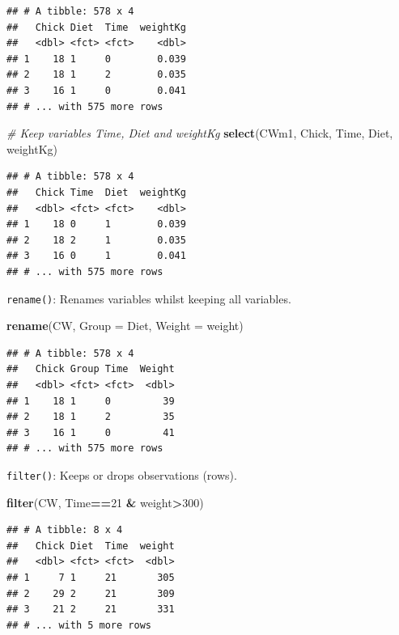 \documentclass[]{book}
\newenvironment{Shaded}{\begin{snugshade}}{\end{snugshade}}
\newcommand{\CommentTok}[1]{\textcolor[rgb]{0.56,0.35,0.01}{\textit{#1}}}
\newcommand{\DataTypeTok}[1]{\textcolor[rgb]{0.13,0.29,0.53}{#1}}
\newcommand{\DecValTok}[1]{\textcolor[rgb]{0.00,0.00,0.81}{#1}}
\newcommand{\KeywordTok}[1]{\textcolor[rgb]{0.13,0.29,0.53}{\textbf{#1}}}
\newcommand{\NormalTok}[1]{#1}
\newcommand{\OperatorTok}[1]{\textcolor[rgb]{0.81,0.36,0.00}{\textbf{#1}}}
\newcommand{\StringTok}[1]{\textcolor[rgb]{0.31,0.60,0.02}{#1}}
\theoremstyle{definition}
\theoremstyle{definition}
\theoremstyle{definition}
\theoremstyle{remark}
\begin{document}
\begin{verbatim}
## # A tibble: 578 x 4
##   Chick Diet  Time  weightKg
##   <dbl> <fct> <fct>    <dbl>
## 1    18 1     0        0.039
## 2    18 1     2        0.035
## 3    16 1     0        0.041
## # ... with 575 more rows
\end{verbatim}

\begin{Shaded}
\begin{Highlighting}[]
\CommentTok{# Keep variables Time, Diet and weightKg}
\KeywordTok{select}\NormalTok{(CWm1, Chick, Time, Diet, weightKg)}
\end{Highlighting}
\end{Shaded}

\begin{verbatim}
## # A tibble: 578 x 4
##   Chick Time  Diet  weightKg
##   <dbl> <fct> <fct>    <dbl>
## 1    18 0     1        0.039
## 2    18 2     1        0.035
## 3    16 0     1        0.041
## # ... with 575 more rows
\end{verbatim}

\texttt{rename()}: Renames variables whilst keeping all variables.

\begin{Shaded}
\begin{Highlighting}[]
\KeywordTok{rename}\NormalTok{(CW, }\DataTypeTok{Group =}\NormalTok{ Diet, }\DataTypeTok{Weight =}\NormalTok{ weight)}
\end{Highlighting}
\end{Shaded}

\begin{verbatim}
## # A tibble: 578 x 4
##   Chick Group Time  Weight
##   <dbl> <fct> <fct>  <dbl>
## 1    18 1     0         39
## 2    18 1     2         35
## 3    16 1     0         41
## # ... with 575 more rows
\end{verbatim}

\texttt{filter()}: Keeps or drops observations (rows).

\begin{Shaded}
\begin{Highlighting}[]
\KeywordTok{filter}\NormalTok{(CW, Time}\OperatorTok{==}\DecValTok{21} \OperatorTok{&}\StringTok{ }\NormalTok{weight}\OperatorTok{>}\DecValTok{300}\NormalTok{)}
\end{Highlighting}
\end{Shaded}

\begin{verbatim}
## # A tibble: 8 x 4
##   Chick Diet  Time  weight
##   <dbl> <fct> <fct>  <dbl>
## 1     7 1     21       305
## 2    29 2     21       309
## 3    21 2     21       331
## # ... with 5 more rows
\end{verbatim}
\end{document}
